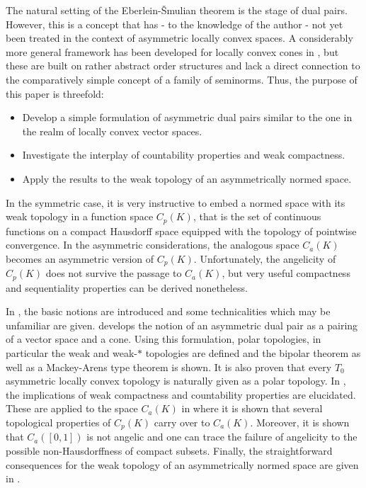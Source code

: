 \documentclass[
	paper=A4,
	pagesize=auto,
	fontsize=12pt
]{scrartcl}
\theoremstyle{plain}
\theoremstyle{remark}
\theoremstyle{definition}
\begin{document}
The natural setting of the Eberlein-Šmulian theorem is the stage of dual pairs.
However, this is a concept that has - to the knowledge of the author - not yet been treated in the context of asymmetric locally convex spaces.
A considerably more general framework has been developed for locally convex cones in \cite[Chapter II.3]{src:KeimelRoth:OrderedConesAndApproximation}, but these are built on rather abstract order structures and lack a direct connection to the comparatively simple concept of a family of seminorms.
Thus, the purpose of this paper is threefold:
%
\begin{itemize}
\item Develop a simple formulation of asymmetric dual pairs similar to the one in the realm of locally convex vector spaces.
\item Investigate the interplay of countability properties and weak compactness.
\item Apply the results to the weak topology of an asymmetrically normed space.
\end{itemize}
%
In the symmetric case, it is very instructive to embed a normed space with its weak topology in a function space $C_p(K)$, that is the set of continuous functions on a compact Hausdorff space equipped with the topology of pointwise convergence.
In the asymmetric considerations, the analogous space $C_a(K)$ becomes an asymmetric version of $C_p(K)$.
Unfortunately, the angelicity of $C_p(K)$ does not survive the passage to $C_a(K)$, but very useful compactness and sequentiality properties can be derived nonetheless.

In , the basic notions are introduced and some technicalities which may be unfamiliar are given.
 develops the notion of an asymmetric dual pair as a pairing of a vector space and a cone.
Using this formulation, polar topologies, in particular the weak and weak-$\ast$ topologies are defined and the bipolar theorem as well as a Mackey-Arens type theorem is shown.
It is also proven that every $T_0$ asymmetric locally convex topology is naturally given as a polar topology.
In , the implications of weak compactness and countability properties are elucidated.
These are applied to the space $C_a(K)$ in  where it is shown that several topological properties of $C_p(K)$ carry over to $C_a(K)$.
Moreover, it is shown that $C_a([0,1])$ is not angelic and one can trace the failure of angelicity to the possible non-Hausdorffness of compact subsets.
Finally, the straightforward consequences for the weak topology of an asymmetrically normed space are given in .
%
\end{document}

